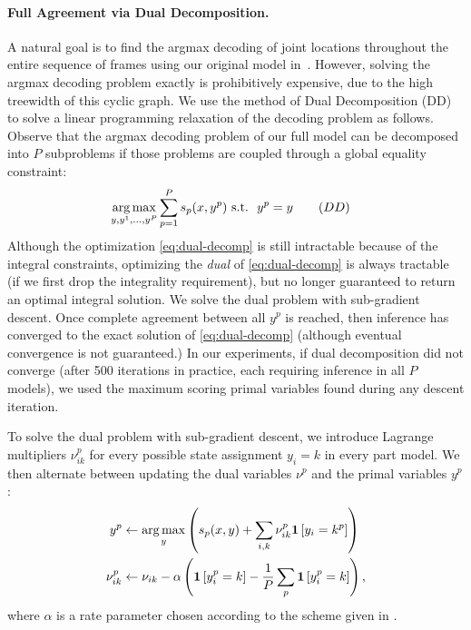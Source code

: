 \paragraph{Full Agreement via Dual Decomposition.} A natural goal is
to find the argmax decoding of joint locations throughout the entire
sequence of frames using our original model in~.  However, 
solving the argmax decoding problem
exactly is prohibitively expensive, due to the high treewidth of this
cyclic graph. We use the method of Dual Decomposition (DD)
\cite{bertsekas99,komodakis2007dualdecomp} to solve a linear
programming relaxation of the decoding problem as follows. Observe
that the argmax decoding problem of our full model can be decomposed
into $P$ subproblems { if those problems are coupled through a global
  equality constraint}:
\begin{align}
  \label{eq:dual-decomp}
&\mathop{\arg\max}_{y, y^1,\dots,y^P} \sum_{p=1}^P s_p(x,y^p)  \textrm{ s.t. } \:  y^p=y  \quad{}\quad{(DD)}
\end{align}
Although the optimization \eqref{eq:dual-decomp} is still intractable because of the integral constraints, optimizing the {\em dual} of \eqref{eq:dual-decomp} is always
tractable (if we first drop the integrality requirement), but no longer guaranteed to return an optimal integral solution. We solve the dual problem with sub-gradient descent. Once complete agreement between all
$y^p$ is reached, then inference has converged to the exact solution
of \eqref{eq:dual-decomp} (although eventual convergence is not
guaranteed.) In our experiments, if dual decomposition did not
converge (after 500 iterations in practice, each requiring inference in all $P$ models), we used the maximum scoring primal variables found during
any descent iteration.

To solve the dual problem with sub-gradient descent, we introduce
Lagrange multipliers $\nu_{ik}^p$ for every possible state assignment
$y_i = k$ in every part model. We then alternate between updating the
dual variables $\nu^p$ and the primal variables $y^p$:
\begin{align}
  y^p & \leftarrow \mathop{\arg\max}_y \left( s_p(x,y) +  \sum_{i,k} \nu^p_{ik} \mathbf{1}\left[y_i=k^p\right]\right) \\
  \nu^p_{ik} & \leftarrow \nu_{ik} - \alpha\left(  \mathbf{1}\left[y_i^p=k\right] - \frac{1}{P}\sum_p \mathbf{1}\left[y_i^p=k\right] \right),
\end{align}
where $\alpha$ is a rate parameter chosen according to the scheme given in \cite{komodakis2007dualdecomp}.
 


